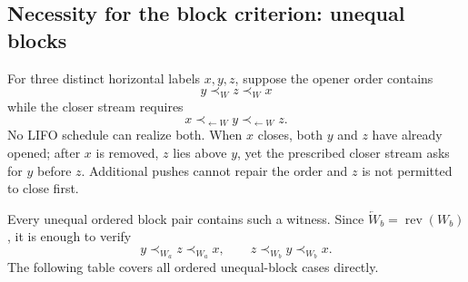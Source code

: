\documentclass[11pt]{article}
\theoremstyle{definition}
\theoremstyle{remark}
\begin{document}
\subsection{Necessity for the block criterion: unequal
blocks}\label{e.5.-necessity-for-the-block-criterion-unequal-blocks}

For three distinct horizontal labels \(x,y,z\), suppose the opener order
contains \[
y\prec_W z\prec_W x
\] while the closer stream requires \[
x\prec_{\leftarrow W} y\prec_{\leftarrow W} z.
\] No LIFO schedule can realize both. When \(x\) closes, both \(y\) and
\(z\) have already opened; after \(x\) is removed, \(z\) lies above
\(y\), yet the prescribed closer stream asks for \(y\) before \(z\).
Additional pushes cannot repair the order and \(z\) is not permitted to
close first.

Every unequal ordered block pair contains such a witness. Since
\(\overleftarrow{W}_b=\operatorname{rev}(W_b)\), it is enough to verify
\[
y\prec_{W_a}z\prec_{W_a}x,
\qquad
z\prec_{W_b}y\prec_{W_b}x.
\] The following table covers all ordered unequal-block cases directly.
\end{document}
